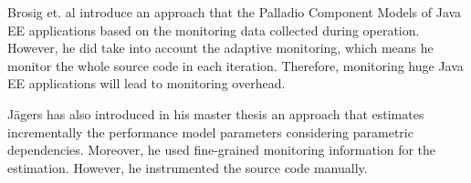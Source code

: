 Brosig et. al \cite{brosig2009automated} introduce an approach that the Palladio Component Models of Java EE applications based on the monitoring data collected during operation. However, he did take into account the adaptive monitoring, which means he monitor the whole source code in each iteration. Therefore, monitoring huge Java EE applications will lead to monitoring overhead.    

Jägers has also introduced in his master thesis \cite{jagers2018Iterative} an approach that estimates incrementally the performance model parameters considering parametric dependencies. Moreover, he used fine-grained monitoring information for the estimation. However, he instrumented the source code manually. 
